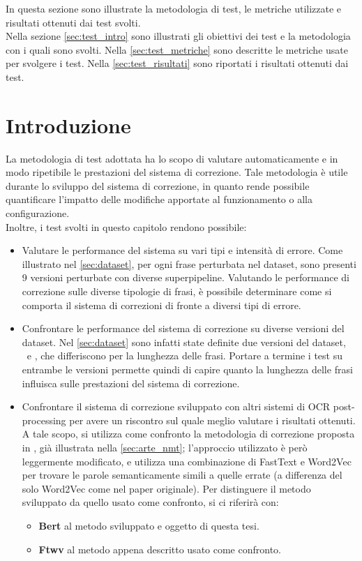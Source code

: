 In questa sezione sono illustrate la metodologia di test, le metriche utilizzate e risultati ottenuti dai test svolti.\\
Nella sezione \autoref{sec:test_intro} sono illustrati gli obiettivi dei test e la metodologia con i quali sono svolti. Nella \autoref{sec:test_metriche} sono descritte le metriche usate per svolgere i test. Nella \autoref{sec:test_risultati} sono riportati i risultati ottenuti dai test.

\section{Introduzione}
\label{sec:test_intro}
La metodologia di test adottata ha lo scopo di valutare automaticamente e in modo ripetibile le prestazioni del sistema di correzione. Tale metodologia è utile durante lo sviluppo del sistema di correzione, in quanto rende possibile quantificare l'impatto delle modifiche apportate al funzionamento o alla configurazione.\\
Inoltre, i test svolti in questo capitolo rendono possibile:
\begin{itemize}
\item Valutare le performance del sistema su vari tipi e intensità di errore. Come illustrato nel \autoref{sec:dataset}, per ogni frase perturbata nel dataset, sono presenti 9 versioni perturbate con diverse superpipeline. Valutando le performance di correzione sulle diverse tipologie di frasi, è possibile determinare come si comporta il sistema di correzioni di fronte a diversi tipi di errore.

\item Confrontare le performance del sistema di correzione su diverse versioni del dataset. Nel \autoref{sec:dataset} sono infatti state definite due versioni del dataset, \dsta\ e \dstb, che differiscono per la lunghezza delle frasi. Portare a termine i test su entrambe le versioni permette quindi di capire quanto la lunghezza delle frasi influisca sulle prestazioni del sistema di correzione.

\item Confrontare il sistema di correzione sviluppato con altri sistemi di OCR post-processing per avere un riscontro sul quale meglio valutare i risultati ottenuti. A tale scopo, si utilizza come confronto la metodologia di correzione proposta in \cite{hamalainen2019paft}, già illustrata nella \autoref{sec:arte_nmt}; l'approccio utilizzato è però leggermente modificato, e utilizza una combinazione di FastText e Word2Vec per trovare le parole semanticamente simili a quelle errate (a differenza del solo Word2Vec come nel paper originale). Per distinguere il metodo sviluppato da quello usato come confronto, si ci riferirà con:
	\begin{itemize}
	\item \textbf{Bert} al metodo sviluppato e oggetto di questa tesi.
	\item \textbf{Ftwv} al metodo appena descritto usato come confronto.
	\end{itemize}

\end{itemize}

